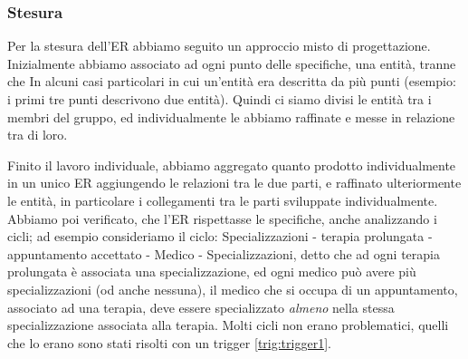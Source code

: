 \documentclass[11pt,a4paper]{article}
\begin{document}
\subsubsection{Stesura}
Per la stesura dell'ER abbiamo seguito un approccio misto di progettazione.
Inizialmente abbiamo associato ad ogni punto delle specifiche, una entità, tranne che In
alcuni casi particolari in cui un'entità era descritta da più punti (esempio: i primi tre punti
descrivono due entità). Quindi ci siamo divisi le entità tra i membri del gruppo, ed 
individualmente le abbiamo raffinate e messe in relazione tra di loro.

Finito il lavoro individuale, abbiamo aggregato quanto prodotto individualmente in un unico ER 
aggiungendo le relazioni tra le due parti, e raffinato ulteriormente le entità, in particolare
i collegamenti tra le parti sviluppate individualmente. Abbiamo poi verificato, che l'ER rispettasse le specifiche,
anche analizzando i cicli; ad esempio consideriamo il ciclo: Specializzazioni - terapia prolungata - appuntamento accettato 
- Medico - Specializzazioni, detto che ad ogni terapia prolungata è associata una specializzazione, ed ogni medico può avere più
specializzazioni (od anche nessuna), il medico che si occupa di un appuntamento, associato ad una terapia, deve essere specializzato
\emph{almeno} nella stessa specializzazione associata alla terapia. Molti cicli non erano problematici,
quelli che lo erano sono stati risolti con un trigger \ref{trig:trigger1}.
\end{document}
